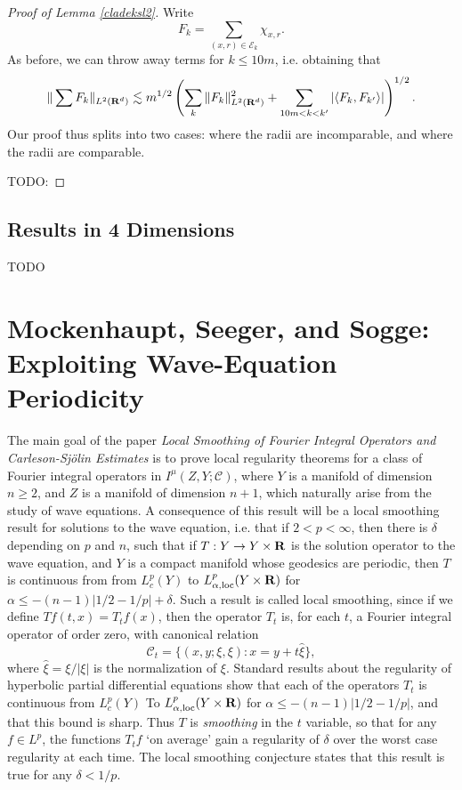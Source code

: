 \begin{proof} [Proof of Lemma \ref{cladeksl2}]
    Write
    \[ F_k = \sum_{(x,r) \in \mathcal{E}_k} \chi_{x,r}. \]
    As before, we can throw away terms for $k \leq 10 m$, i.e. obtaining that
    \[ \| \sum F_k \|_{L^2(\operatorname{\mathbf{R}}^d)} \lesssim m^{1/2} \left( \sum_k \| F_k \|_{L^2(\operatorname{\mathbf{R}}^d)}^2 + \sum_{10m < k < k'} |\langle F_k, F_{k'} \rangle| \right)^{1/2}. \]
    Our proof thus splits into two cases: where the radii are incomparable, and where the radii are comparable.

    TODO:
\end{proof}

\section{Results in 4 Dimensions}

TODO





\chapter{Mockenhaupt, Seeger, and Sogge: Exploiting Wave-Equation Periodicity}

The main goal of the paper \emph{Local Smoothing of Fourier Integral Operators and {C}arleson-{S}j\"{o}lin Estimates} is to prove local regularity theorems for a class of Fourier integral operators in $I^\mu(Z,Y;\mathcal{C})$, where $Y$ is a manifold of dimension $n \geq 2$, and $Z$ is a manifold of dimension $n+1$, which naturally arise from the study of wave equations. A consequence of this result will be a local smoothing result for solutions to the wave equation, i.e. that if $2 < p < \infty$, then there is $\delta$ depending on $p$ and $n$, such that if $T: Y \to Y \times \operatorname{\mathbf{R}}$ is the solution operator to the wave equation, and $Y$ is a compact manifold whose geodesics are periodic, then $T$ is continuous from from $L^p_c(Y)$ to $L^p_{\alpha,\text{loc}}(Y \times \operatorname{\mathbf{R}})$ for $\alpha \leq -(n-1)|1/2 - 1/p| + \delta$. Such a result is called local smoothing, since if we define $Tf(t,x) = T_tf(x)$, then the operator $T_t$ is, for each $t$, a Fourier integral operator of order zero, with canonical relation
%
\[ \mathcal{C}_t = \{ (x,y;\xi,\xi) : x = y + t \widehat{\xi} \}, \]
%
where $\widehat{\xi} = \xi / |\xi|$ is the normalization of $\xi$. Standard results about the regularity of hyperbolic partial differential equations show that each of the operators $T_t$ is continuous from $L^p_c(Y)$ To $L^p_{\alpha,\text{loc}}(Y \times \operatorname{\mathbf{R}})$ for $\alpha \leq -(n-1)|1/2 - 1/p|$, and that this bound is sharp. Thus $T$ is \emph{smoothing} in the $t$ variable, so that for any $f \in L^p$, the functions $T_t f$ `on average' gain a regularity of $\delta$ over the worst case regularity at each time. The local smoothing conjecture states that this result is true for any $\delta < 1/p$.

